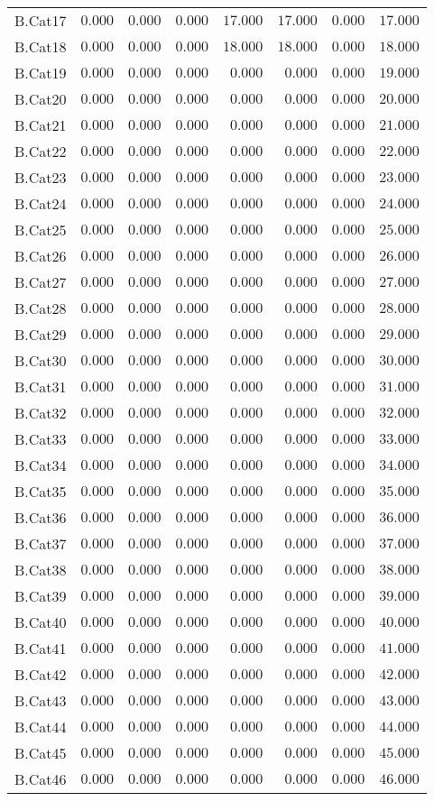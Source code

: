 \documentclass[6pt]{article}
\begin{document}
{\begin{longtable}{lrrrrrrr}
B.Cat17&$ 0.000$&$ 0.000$&$ 0.000$&$ 17.000$&$ 17.000$&$  0.000$&$17.000$\tabularnewline
B.Cat18&$ 0.000$&$ 0.000$&$ 0.000$&$ 18.000$&$ 18.000$&$  0.000$&$18.000$\tabularnewline
B.Cat19&$ 0.000$&$ 0.000$&$ 0.000$&$  0.000$&$  0.000$&$  0.000$&$19.000$\tabularnewline
B.Cat20&$ 0.000$&$ 0.000$&$ 0.000$&$  0.000$&$  0.000$&$  0.000$&$20.000$\tabularnewline
B.Cat21&$ 0.000$&$ 0.000$&$ 0.000$&$  0.000$&$  0.000$&$  0.000$&$21.000$\tabularnewline
B.Cat22&$ 0.000$&$ 0.000$&$ 0.000$&$  0.000$&$  0.000$&$  0.000$&$22.000$\tabularnewline
B.Cat23&$ 0.000$&$ 0.000$&$ 0.000$&$  0.000$&$  0.000$&$  0.000$&$23.000$\tabularnewline
B.Cat24&$ 0.000$&$ 0.000$&$ 0.000$&$  0.000$&$  0.000$&$  0.000$&$24.000$\tabularnewline
B.Cat25&$ 0.000$&$ 0.000$&$ 0.000$&$  0.000$&$  0.000$&$  0.000$&$25.000$\tabularnewline
B.Cat26&$ 0.000$&$ 0.000$&$ 0.000$&$  0.000$&$  0.000$&$  0.000$&$26.000$\tabularnewline
B.Cat27&$ 0.000$&$ 0.000$&$ 0.000$&$  0.000$&$  0.000$&$  0.000$&$27.000$\tabularnewline
B.Cat28&$ 0.000$&$ 0.000$&$ 0.000$&$  0.000$&$  0.000$&$  0.000$&$28.000$\tabularnewline
B.Cat29&$ 0.000$&$ 0.000$&$ 0.000$&$  0.000$&$  0.000$&$  0.000$&$29.000$\tabularnewline
B.Cat30&$ 0.000$&$ 0.000$&$ 0.000$&$  0.000$&$  0.000$&$  0.000$&$30.000$\tabularnewline
B.Cat31&$ 0.000$&$ 0.000$&$ 0.000$&$  0.000$&$  0.000$&$  0.000$&$31.000$\tabularnewline
B.Cat32&$ 0.000$&$ 0.000$&$ 0.000$&$  0.000$&$  0.000$&$  0.000$&$32.000$\tabularnewline
B.Cat33&$ 0.000$&$ 0.000$&$ 0.000$&$  0.000$&$  0.000$&$  0.000$&$33.000$\tabularnewline
B.Cat34&$ 0.000$&$ 0.000$&$ 0.000$&$  0.000$&$  0.000$&$  0.000$&$34.000$\tabularnewline
B.Cat35&$ 0.000$&$ 0.000$&$ 0.000$&$  0.000$&$  0.000$&$  0.000$&$35.000$\tabularnewline
B.Cat36&$ 0.000$&$ 0.000$&$ 0.000$&$  0.000$&$  0.000$&$  0.000$&$36.000$\tabularnewline
B.Cat37&$ 0.000$&$ 0.000$&$ 0.000$&$  0.000$&$  0.000$&$  0.000$&$37.000$\tabularnewline
B.Cat38&$ 0.000$&$ 0.000$&$ 0.000$&$  0.000$&$  0.000$&$  0.000$&$38.000$\tabularnewline
\newpage
B.Cat39&$ 0.000$&$ 0.000$&$ 0.000$&$  0.000$&$  0.000$&$  0.000$&$39.000$\tabularnewline
B.Cat40&$ 0.000$&$ 0.000$&$ 0.000$&$  0.000$&$  0.000$&$  0.000$&$40.000$\tabularnewline
B.Cat41&$ 0.000$&$ 0.000$&$ 0.000$&$  0.000$&$  0.000$&$  0.000$&$41.000$\tabularnewline
B.Cat42&$ 0.000$&$ 0.000$&$ 0.000$&$  0.000$&$  0.000$&$  0.000$&$42.000$\tabularnewline
B.Cat43&$ 0.000$&$ 0.000$&$ 0.000$&$  0.000$&$  0.000$&$  0.000$&$43.000$\tabularnewline
B.Cat44&$ 0.000$&$ 0.000$&$ 0.000$&$  0.000$&$  0.000$&$  0.000$&$44.000$\tabularnewline
B.Cat45&$ 0.000$&$ 0.000$&$ 0.000$&$  0.000$&$  0.000$&$  0.000$&$45.000$\tabularnewline
B.Cat46&$ 0.000$&$ 0.000$&$ 0.000$&$  0.000$&$  0.000$&$  0.000$&$46.000$\tabularnewline

\end{longtable}}
\end{document}
